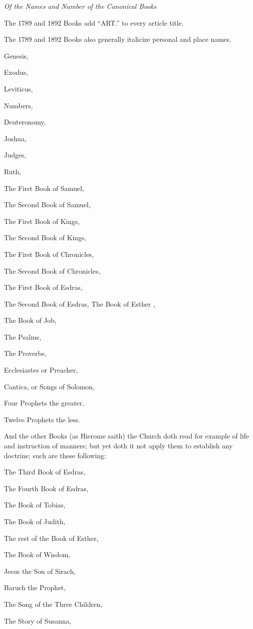 \emph{Of
the Names and Number of the Canonical Books}

The
1789 and 1892 Books add ``ART.''
to every article title.

The
1789 and 1892 Books also generally italicize personal and place names.

Genesis,

Exodus,

Leviticus,

Numbers,

Deuteronomy,

Joshua,

Judges, 

Ruth,

The
First Book of Samuel,

The Second Book of Samuel,

The First Book of Kings,

The Second Book of Kings,

The First Book of Chronicles,

The Second Book of Chronicles, 

The First Book of Esdras,

The Second Book of Esdras, The
Book of Esther ,

The Book of Job,

The Psalms,

The Proverbs,

Ecclesiastes or Preacher,

Cantica, or Songs of Solomon,

Four Prophets the greater,

Twelve Prophets the less.

And
the other Books (as Hierome saith) the Church doth read for example of
life and instruction of manners; but yet doth it not apply them to establish
any doctrine; such are these following:

The
Third Book of Esdras,

The Fourth Book of Esdras, 

The Book of Tobias,

The Book of Judith, 

The rest of the Book of Esther,

The Book of Wisdom,

Jesus the Son of Sirach,

Baruch
the Prophet,

The Song of the Three Children,

The Story of Susanna,

